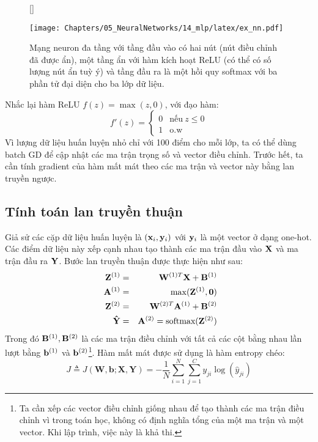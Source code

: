 \begin{figure}[t]
[\FBwidth]
{\caption{
Mạng neuron đa tầng với tầng đầu vào có hai nút (nút điều chỉnh đã được ẩn),
một tầng ẩn với hàm kích hoạt ReLU (có thể có số lượng nút ẩn
tuỳ ý) và tầng đầu ra là một hồi quy softmax với ba phần tử đại diện
cho ba lớp dữ liệu.
}
\label{fig:14_8}}
{ %
\texttt{[image: Chapters/05\_NeuralNetworks/14\_mlp/latex/ex\_nn.pdf]}
}
\end{figure}
Nhắc lại hàm ReLU $f(z) = \max(z, 0)$, với đạo hàm:
\begin{equation}
f'(z) = \left\{
\begin{matrix}
0 & \text{nếu}~ z \leq 0 \\
1 & \text{o.w}
\end{matrix}
\right.
\end{equation}
Vì lượng dữ liệu huấn luyện nhỏ chỉ với 100 điểm cho mỗi lớp, ta có thể dùng
batch GD để cập nhật các ma trận trọng số và vector điều chỉnh. Trước hết, ta cần tính
gradient của hàm mất mát theo các ma trận và vector này bằng lan truyền ngược.


\subsection{Tính toán lan truyền thuận}
Giả sử các cặp dữ liệu huấn luyện là $(\mathbf{x}_i, \mathbf{y}_i)$ với $\mathbf{y}_i$ là một vector
ở dạng one-hot. Các điểm dữ liệu này xếp cạnh nhau tạo thành các ma trận đầu
vào $\mathbf{X}$ và ma trận đầu ra $\mathbf{Y}$. Bước lan truyền thuận được
thực hiện như sau:
\begin{eqnarray}
\mathbf{Z}^{(1)} &=& \mathbf{W}^{(1)T}\mathbf{X} + \mathbf{B}^{(1)}\\\
\mathbf{A}^{(1)} &=& \max(\mathbf{Z}^{(1)}, \mathbf{0}) \\\
\mathbf{Z}^{(2)} &=& \mathbf{W}^{(2)T}\mathbf{A}^{(1)} + \mathbf{B}^{(2)}\\\
\mathbf{\hat{Y}} &=& \mathbf{A}^{(2)} = \text{softmax}(\mathbf{Z}^{(2)})
\end{eqnarray}
Trong đó $\mathbf{B}^{(1)}, \mathbf{B}^{(2)}$ là các ma trận điều chỉnh với tất cả các cột bằng nhau
lần lượt bằng $\mathbf{b}^{(1)}$ và $\mathbf{b}^{(2)}$\footnote{Ta cần xếp các vector điều chỉnh
giống nhau để tạo thành các ma trận điều chỉnh vì trong toán học, không có định nghĩa
tổng của một ma trận và một vector. Khi lập trình, việc này là khả thi.}.
Hàm mất mát được sử dụng là hàm entropy chéo:
\begin{equation}
J \triangleq J(\mathbf{W, b}; \mathbf{X, Y}) = -\frac{1}{N}\sum_{i = 1}^N \sum_{j = 1}^C y_{ji}\log(\hat{y}_{ji})
\end{equation}


